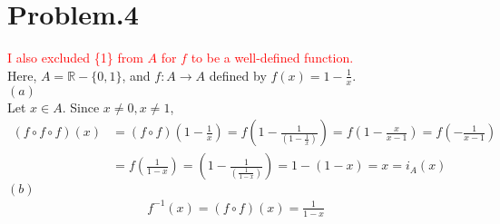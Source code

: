 \documentclass[12pt]{article}
\begin{document}
\section*{Problem.4}
\textcolor{red}{I also excluded \{1\} from $A$ for $f$ to be a well-defined function.}\\[1em]
Here, $A = \mathbb{R} - \{0, 1\}$, and $f: A \longrightarrow A$ defined by $f(x) = 1 - \frac{1}{x}$.\\[1em]
$(a)$\\
Let $x \in A$. Since $x \neq 0, x \neq 1$,
\begin{align*}
(f \circ f \circ f)(x) &= (f \circ f)\left(1 - \frac{1}{x}\right) = f\left(1 - \frac{1}{\left(1 - \frac{1}{x}\right)}\right) = f\left(1 - \frac{x}{x - 1}\right) = f \left(-\frac{1}{x - 1}\right)\\[1em]
&= f \left(\frac{1}{1 - x}\right) = \left(1 - \frac{1}{\left(\frac{1}{1 - x}\right)}\right) = 1 - \left(1 - x \right) = x = i_A(x)
\end{align*}
$(b)$\\
\begin{gather*}
f^{-1}(x) = (f \circ f)(x) = \frac{1}{1 - x}
\end{gather*}
\end{document}

